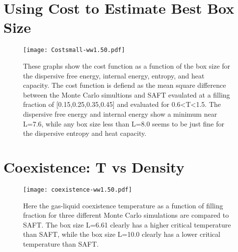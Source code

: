 \pagebreak
\section{Using Cost to Estimate Best Box Size}
\begin{figure}[h]
\vspace*{-10mm}
\hspace*{-6mm}
	\centering
	\texttt{[image: Costsmall-ww1.50.pdf]}
	\caption{\scriptsize
	These graphs show the cost function as a function of the box size for the dispersive free energy, internal energy, entropy, and heat capacity. The cost function is defiend as the mean square difference between the Monte Carlo simultions and SAFT evaulated at a filling fraction of [0.15,0.25,0.35,0.45] and evaluated for 0.6\textless T\textless 1.5. The dispersive free energy and internal energy show a minimum near L=7.6, while any box size less than L=8.0 seems to be just fine for the dispersive entropy and heat capacity.}
	\label{fig:Cost}
\end{figure}
\section{Coexistence: T vs Density}
\begin{figure}[h]
\vspace*{-10mm}
\hspace*{-6mm}
	\centering
	\texttt{[image: coexistence-ww1.50.pdf]}
	\caption{\scriptsize
	Here the gas-liquid coexistence temperature as a function of filling fraction for three different Monte Carlo simulations are compared to SAFT. The box size L=6.61 clearly has a higher critical temperature than SAFT, while the box size L=10.0 clearly has a lower critical temperature than SAFT.}
	\label{fig:Coexistence}
\end{figure}



